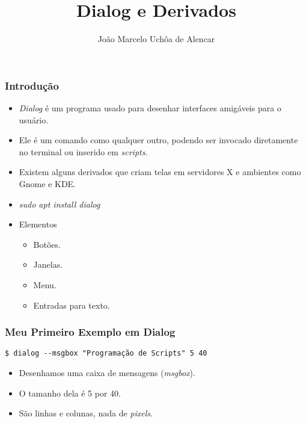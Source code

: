 \documentclass{beamer}
\title{Dialog e Derivados}
\author[João Marcelo Uchôa de Alencar]{João Marcelo Uchôa de Alencar}
\institute{Universidade Federal do Ceará - Quixadá}
\begin{document}
   \begin{frame}
      \titlepage
   \end{frame}

   \begin{frame}
      \frametitle{Introdução}
      \begin{itemize}
         \item \textit{Dialog} é um programa usado para desenhar interfaces amigáveis para o usuário. 
	 \item Ele é um comando como qualquer outro, podendo ser invocado diretamente no terminal ou inserido em \textit{scripts}.
	 \item Existem alguns derivados que criam telas em servidores X e ambientes como Gnome e KDE.
	 \item \textit{sudo apt install dialog}
	 \item Elementos
	 \begin{itemize}
	    \item Botões.
	    \item Janelas.
	    \item Menu.
	    \item Entradas para texto.
	 \end{itemize}
      \end{itemize}
   \end{frame}

   \begin{frame}[fragile]
      \frametitle{Meu Primeiro Exemplo em Dialog}
      \begin{verbatim}
$ dialog --msgbox "Programação de Scripts" 5 40
      \end{verbatim}
      \begin{itemize}
         \item Desenhamos uma caixa de mensagens (\textit{msgbox}).
	 \item O tamanho dela é 5 por 40.
	 \item São linhas e colunas, nada de \textit{pixels}.
      \end{itemize}
\end{frame}
\end{document}
